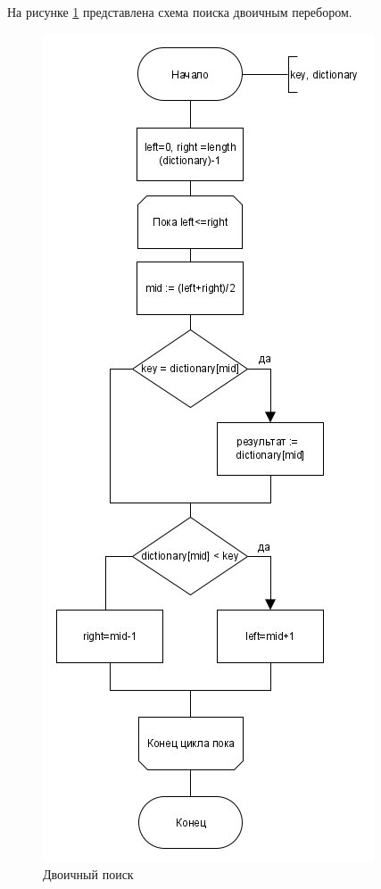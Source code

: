 На рисунке \ref{fig:binsearch} представлена схема поиска двоичным перебором.
\begin{figure}[H]
	\centering
	\includegraphics[height=0.7\textheight]{src/binsearch}
	\caption{Двоичный поиск}
	\label{fig:binsearch}
\end{figure}


